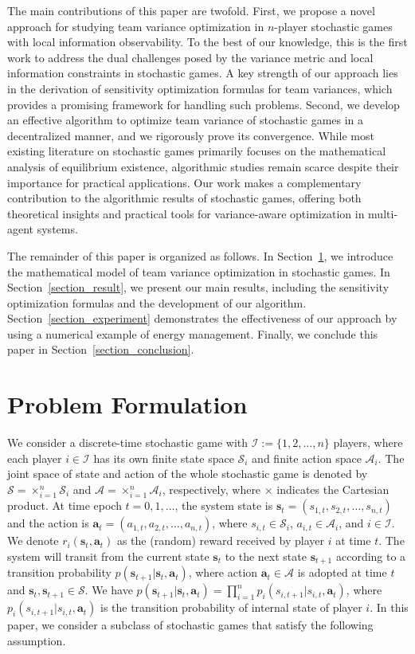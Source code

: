\documentclass[12pt]{article}
\begin{document}
The main contributions of this paper are twofold. First, we propose
a novel approach for studying team variance optimization in
$n$-player stochastic games with local information observability. To
the best of our knowledge, this is the first work to address the
dual challenges posed by the variance metric and local information
constraints in stochastic games. A key strength of our approach lies
in the derivation of sensitivity optimization formulas for team
variances, which provides a promising framework for handling such
problems. Second, we develop an effective algorithm to optimize team
variance of stochastic games in a decentralized manner, and we
rigorously prove its convergence. While most existing literature on
stochastic games primarily focuses on the mathematical analysis of
equilibrium existence, algorithmic studies remain scarce despite
their importance for practical applications. Our work makes a
complementary contribution to the algorithmic results of stochastic
games, offering both theoretical insights and practical tools for
variance-aware optimization in multi-agent systems.


The remainder of this paper is organized as follows. In
Section~\ref{section_model}, we introduce the mathematical model of
team variance optimization in stochastic games. In
Section~\ref{section_result}, we present our main results, including
the sensitivity optimization formulas and the development of our
algorithm. Section~\ref{section_experiment} demonstrates the
effectiveness of our approach by using a numerical example of energy
management. Finally, we conclude this paper in
Section~\ref{section_conclusion}.





\section{Problem Formulation}\label{section_model}
We consider a discrete-time stochastic game with $\mathcal
I:=\{1,2,\dots,n\}$ players, where each player $i \in \mathcal I$
has its own finite state space $\mathcal S_i$ and finite action
space $\mathcal A_i$. The joint space of state and action of the
whole stochastic game is denoted by $\mathcal S = \times_{i=1}^{n}
\mathcal S_i$ and $\mathcal A = \times_{i=1}^{n} \mathcal A_i$,
respectively, where $\times$ indicates the Cartesian product. At
time epoch $t=0,1,\dots$, the system state is $\bm s_t=(s_{1,t},
s_{2,t}, \dots, s_{n,t})$ and the action is $\bm a_t=(a_{1,t},
a_{2,t}, \dots, a_{n,t})$, where $s_{i,t} \in \mathcal S_i$,
$a_{i,t} \in \mathcal A_i$, and $i \in \mathcal I$. We denote
$r_i(\bm s_t,\bm a_t)$ as the (random) reward received by player $i$
at time $t$. The system will transit from the current state $\bm
s_t$ to the next state $\bm s_{t+1}$ according to a transition
probability $p(\bm s_{t+1}|\bm s_t, \bm a_t)$, where action $\bm a_t
\in \mathcal A$ is adopted at time $t$ and $\bm s_t, \bm s_{t+1} \in
\mathcal S$. We have $p(\bm s_{t+1}|\bm s_t, \bm a_t) =
\prod_{i=1}^{n}p_i(s_{i,t+1}|s_{i,t}, \bm a_t)$, where
$p_i(s_{i,t+1}|s_{i,t}, \bm a_t)$ is the transition probability of
internal state of player $i$. In this paper, we consider a subclass
of stochastic games that satisfy the following assumption.
\end{document}

